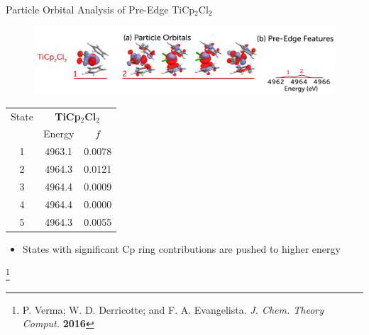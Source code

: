 \documentclass[t]{beamer}
\newcommand\blfootnote[1]{%
  \begingroup
  \renewcommand\thefootnote{}\footnote{#1}%
  \addtocounter{footnote}{-1}%
  \endgroup
}
\begin{document}
\begin{frame}{Particle Orbital Analysis of Pre-Edge TiCp$_2$Cl$_2$}
 \begin{figure}
\includegraphics[scale=0.15]{ticp2cl2_preedge.png}
\end{figure}
\begin{table}
\footnotesize
\begin{tabular}{c@{\hskip 1in}c@{\hskip 1in}c}
\toprule
State &   \multicolumn{2}{c}{\textbf{TiCp$_2$Cl$_2$}}   \\
& Energy & $f$ \\
\cmidrule(r){2-3}
1 & 4963.1 & 0.0078\\
2 & 4964.3 & 0.0121\\
3 & 4964.4 & 0.0009\\
4 & 4964.4 & 0.0000\\
5 & 4964.3 & 0.0055\\
\bottomrule
\end{tabular}
\end{table}
\begin{itemize}
\item States with significant Cp ring contributions are pushed to higher energy
\end{itemize}
\blfootnote{P. Verma; W. D. Derricotte; and F. A. Evangelista. \textit{J. Chem. Theory Comput.} \textbf{2016}}
\end{frame}
\end{document}
